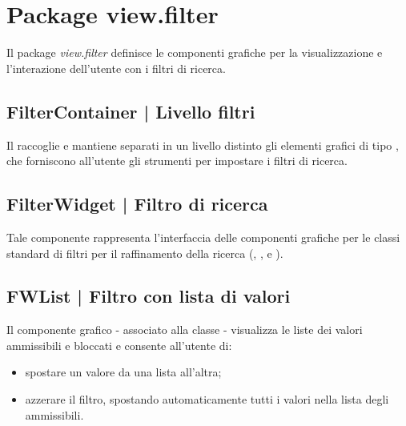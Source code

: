 \documentclass[10pt,a4paper,headinclude,footinclude,hidelinks]{scrreprt} %
\begin{document}
	\section{Package view.filter}
	\label{sec:stage:design:sistema:view.filter}
	Il package \textit{view.filter} definisce le componenti grafiche per la visualizzazione e l'interazione dell'utente con i filtri di ricerca.

	\subsection[FilterContainer]{FilterContainer | Livello filtri}
	\label{sec:stage:design:sistema:view.filter:filter-container}
	Il \textit{} raccoglie e mantiene separati in un livello distinto gli elementi grafici di tipo \textit{}, che forniscono all'utente gli strumenti per impostare i filtri di ricerca.

	\subsection[FilterWidget]{FilterWidget | Filtro di ricerca}
	\label{sec:stage:design:sistema:view.filter:filter}
	Tale componente rappresenta l'interfaccia delle componenti grafiche per le classi standard di filtri per il raffinamento della ricerca (\textit{}, \textit{}, \textit{} e \textit{}).

	\subsection[FWList]{FWList | Filtro con lista di valori}
	\label{sec:stage:design:sistema:view.filter:list-filter}
	Il componente grafico - associato alla classe \textit{} - visualizza le liste dei valori ammissibili e bloccati e consente all'utente di:
	\begin{itemize}
	\item spostare un valore da una lista all'altra;
	\item azzerare il filtro, spostando automaticamente tutti i valori nella lista degli ammissibili.
	\end{itemize}
\end{document}
